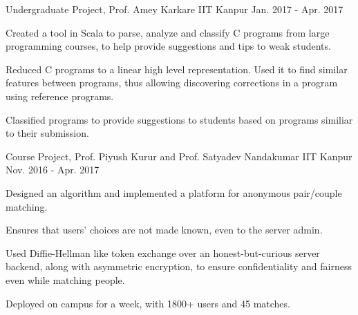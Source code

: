 


\begin{cventries}

  \cventry
  {Undergraduate Project, Prof. Amey Karkare}
  {{}
    {}}
  {IIT Kanpur}
  {Jan. 2017 - Apr. 2017}
  {
    \begin{cvitems}
    \item Created a tool in Scala to parse, analyze and classify C programs from large programming courses, to help provide suggestions and tips to weak students.
    \item Reduced C programs to a linear high level representation. Used it to find similar features between programs, thus allowing discovering corrections in a program using reference programs.
    \item Classified programs to provide suggestions to students based on programs similiar to their submission.
    \end{cvitems}
    \vspace{-5mm}
  }

  \cventry
  {Course Project, Prof. Piyush Kurur and
    Prof. Satyadev Nandakumar}
  {\href{https://github.com/pclubiitk/puppy-love}{}}
  {IIT Kanpur}
  {Nov. 2016 - Apr. 2017}
  {
    \begin{cvitems}
      \item Designed an algorithm and implemented a platform
        for anonymous pair/couple matching.
      \item Ensures that users' choices are not made known, even to the
        server admin.
      \item Used Diffie-Hellman like token exchange over an
        honest-but-curious server backend, along with asymmetric encryption, to
        ensure confidentiality and fairness even while matching people.
      \item Deployed on campus for a week, with 1800+ users and 45 matches.
    \end{cvitems}
  }



\end{cventries}
